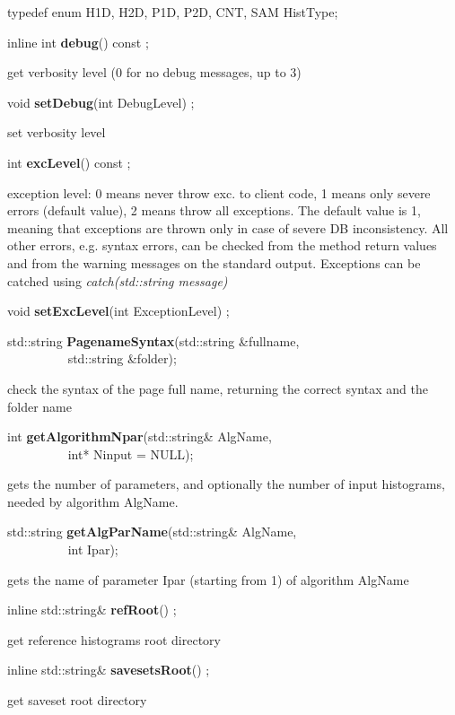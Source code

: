 \item   typedef enum { H1D, H2D, P1D, P2D, CNT, SAM} HistType;
\item    inline int {\bf debug}() const ;

 get verbosity level (0 for no debug messages, up to 3)


\item    void {\bf setDebug}(int DebugLevel) ;

 set verbosity level


\item    int {\bf excLevel}() const ;

 exception level: 0 means never throw exc. to client code, 1 means only
 severe errors (default value), 2 means throw all exceptions.
 The default value is 1, meaning that exceptions are thrown only in
 case of severe DB inconsistency. All other errors, e.g. syntax errors,
 can be checked from the method return values and from the warning
 messages on the standard output.
 Exceptions can be catched using {\it catch(std::string message)}


\item    void {\bf setExcLevel}(int ExceptionLevel) ;




\item    std::string {\bf PagenameSyntax}(std::string \&fullname,\\\mbox{}~~~~~~~~~ std::string \&folder);


 check the syntax of the page full name, returning the correct syntax and the folder name 


\item    int {\bf getAlgorithmNpar}(std::string\& AlgName,\\\mbox{}~~~~~~~~~
		       int* Ninput = NULL);

 gets the number of parameters, and optionally the number of input histograms, needed by algorithm AlgName.


\item    std::string {\bf getAlgParName}(std::string\& AlgName,\\\mbox{}~~~~~~~~~
			    int Ipar);

 gets the name of parameter Ipar (starting from 1) of algorithm AlgName


\item    inline std::string\& {\bf refRoot}() ;

 get reference histograms root directory 


\item    inline std::string\& {\bf savesetsRoot}() ;

 get saveset root directory 



